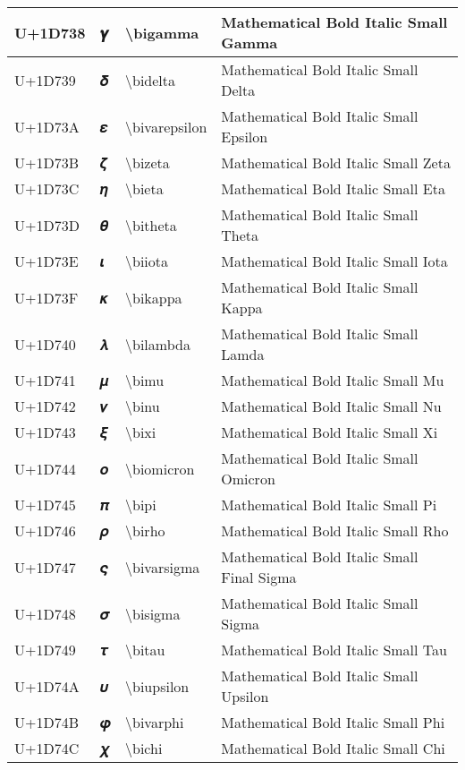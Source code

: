 \begin{table}[h]
\begin{tabulary}{\linewidth}{|L|L|L|L|}
\hline
U+1D738 & 𝜸 & {\textbackslash}bigamma & Mathematical Bold Italic Small Gamma \\
\hline
U+1D739 & 𝜹 & {\textbackslash}bidelta & Mathematical Bold Italic Small Delta \\
\hline
U+1D73A & 𝜺 & {\textbackslash}bivarepsilon & Mathematical Bold Italic Small Epsilon \\
\hline
U+1D73B & 𝜻 & {\textbackslash}bizeta & Mathematical Bold Italic Small Zeta \\
\hline
U+1D73C & 𝜼 & {\textbackslash}bieta & Mathematical Bold Italic Small Eta \\
\hline
U+1D73D & 𝜽 & {\textbackslash}bitheta & Mathematical Bold Italic Small Theta \\
\hline
U+1D73E & 𝜾 & {\textbackslash}biiota & Mathematical Bold Italic Small Iota \\
\hline
U+1D73F & 𝜿 & {\textbackslash}bikappa & Mathematical Bold Italic Small Kappa \\
\hline
U+1D740 & 𝝀 & {\textbackslash}bilambda & Mathematical Bold Italic Small Lamda \\
\hline
U+1D741 & 𝝁 & {\textbackslash}bimu & Mathematical Bold Italic Small Mu \\
\hline
U+1D742 & 𝝂 & {\textbackslash}binu & Mathematical Bold Italic Small Nu \\
\hline
U+1D743 & 𝝃 & {\textbackslash}bixi & Mathematical Bold Italic Small Xi \\
\hline
U+1D744 & 𝝄 & {\textbackslash}biomicron & Mathematical Bold Italic Small Omicron \\
\hline
U+1D745 & 𝝅 & {\textbackslash}bipi & Mathematical Bold Italic Small Pi \\
\hline
U+1D746 & 𝝆 & {\textbackslash}birho & Mathematical Bold Italic Small Rho \\
\hline
U+1D747 & 𝝇 & {\textbackslash}bivarsigma & Mathematical Bold Italic Small Final Sigma \\
\hline
U+1D748 & 𝝈 & {\textbackslash}bisigma & Mathematical Bold Italic Small Sigma \\
\hline
U+1D749 & 𝝉 & {\textbackslash}bitau & Mathematical Bold Italic Small Tau \\
\hline
U+1D74A & 𝝊 & {\textbackslash}biupsilon & Mathematical Bold Italic Small Upsilon \\
\hline
U+1D74B & 𝝋 & {\textbackslash}bivarphi & Mathematical Bold Italic Small Phi \\
\hline
U+1D74C & 𝝌 & {\textbackslash}bichi & Mathematical Bold Italic Small Chi \\

\end{tabulary}
\end{table}
